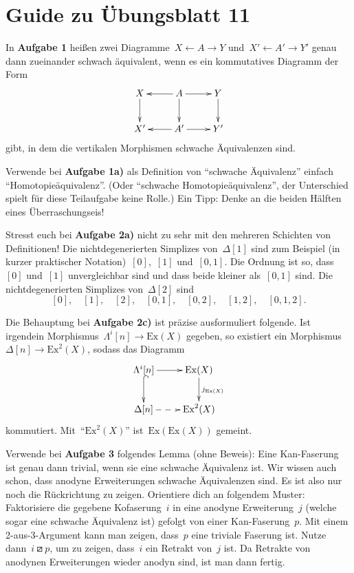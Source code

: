 \documentclass{uebblatt}
\begin{document}
\section*{Guide zu Übungsblatt 11}

In \textbf{Aufgabe 1} heißen zwei Diagramme~$X \leftarrow A \rightarrow Y$
und~$X' \leftarrow A' \rightarrow Y'$ genau dann zueinander schwach äquivalent,
wenn es ein kommutatives Diagramm der Form
\[ \xymatrix{
  X \ar[d] & A \ar[l]\ar[r] \ar[d] & Y \ar[d] \\
  X' & A' \ar[l]\ar[r] & Y'
} \]
gibt, in dem die vertikalen Morphismen schwache Äquivalenzen sind.

Verwende bei \textbf{Aufgabe 1a)} als Definition von "`schwache Äquivalenz"'
einfach "`Homotopieäquivalenz"'. (Oder "`schwache Homotopieäquivalenz"', der
Unterschied spielt für diese Teilaufgabe keine Rolle.) Ein Tipp: Denke an die
beiden Hälften eines Überraschungseis!

Stresst euch bei \textbf{Aufgabe 2a)} nicht zu sehr mit den mehreren Schichten
von Definitionen! Die nichtdegenerierten Simplizes von~$\Delta[1]$ sind zum
Beispiel (in kurzer praktischer Notation)~$[0]$,~$[1]$ und~$[0,1]$. Die Ordnung ist
so, dass~$[0]$ und~$[1]$ unvergleichbar sind und dass beide kleiner als~$[0,1]$
sind. Die nichtdegenerierten Simplizes von~$\Delta[2]$ sind
\[
  [0], \quad
  [1], \quad
  [2], \quad
  [0,1], \quad
  [0,2], \quad
  [1,2], \quad
  [0,1,2].
\]

Die Behauptung bei \textbf{Aufgabe 2c)} ist präzise ausformuliert folgende. Ist
irgendein Morphismus~$\Lambda^i[n] \to \mathrm{Ex}(X)$ gegeben, so existiert
ein Morphismus~$\Delta[n] \to \mathrm{Ex}^2(X)$, sodass das Diagramm
\[ \xymatrix{
  \Lambda^i[n] \ar[r] \ar@{^{(}->}[d] & \mathrm{Ex}(X) \ar[d]^{j_{\mathrm{Ex}(X)}} \\
  \Delta[n] \ar@{-->}[r] & \mathrm{Ex}^2(X)
} \]
kommutiert. Mit~"`$\mathrm{Ex}^2(X)$"' ist~$\mathrm{Ex}(\mathrm{Ex}(X))$ gemeint.

Verwende bei \textbf{Aufgabe 3} folgendes Lemma (ohne Beweis): Eine
Kan-Faserung ist genau dann trivial, wenn sie eine schwache Äquivalenz ist.
Wir wissen auch schon, dass anodyne Erweiterungen schwache Äquivalenzen sind.
Es ist also nur noch die Rückrichtung zu zeigen. Orientiere dich an folgendem
Muster: Faktorisiere die gegebene Kofaserung~$i$ in eine anodyne Erweiterung~$j$
(welche sogar eine schwache Äquivalenz ist) gefolgt von einer Kan-Faserung~$p$.
Mit einem 2-aus-3-Argument kann man zeigen, dass~$p$ eine triviale Faserung
ist. Nutze dann~$i \boxslash p$, um zu zeigen, dass~$i$ ein Retrakt von~$j$
ist. Da Retrakte von anodynen Erweiterungen wieder anodyn sind, ist man dann
fertig.
\end{document}
